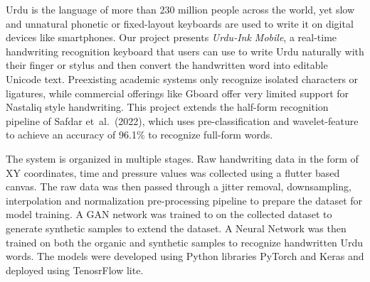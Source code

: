 \documentclass[12pt,a4paper]{report}
\begin{document}

Urdu is the language of more than 230 million people across the world, yet slow and unnatural phonetic or fixed-layout keyboards are used to write it on digital devices like smartphones. Our project presents \emph{Urdu-Ink Mobile}, a real-time handwriting recognition keyboard that users can use to write Urdu naturally with their finger or stylus and then convert the handwritten word into editable Unicode text. Preexisting academic systems only recognize isolated characters or ligatures, while commercial offerings like Gboard offer very limited support for Nastaliq style handwriting. This project extends the half-form recognition pipeline of Safdar et~al.\ (2022), which uses pre-classification and wavelet-feature to achieve an accuracy of 96.1\% to recognize full-form words. 

The system is organized in multiple stages. Raw handwriting data in the form of XY coordinates, time and pressure values was collected using a flutter based canvas. The raw data was then passed through a jitter removal, downsampling, interpolation and normalization pre-processing pipeline to prepare the dataset for model training. A GAN network was trained to on the collected dataset to generate synthetic samples to extend the dataset. A Neural Network was then trained on both the organic and synthetic samples to recognize handwritten Urdu words. The models were developed using Python libraries PyTorch and Keras and deployed using TenosrFlow lite.
\end{document}
